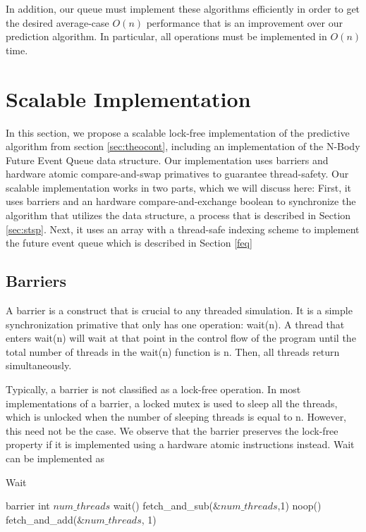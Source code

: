 \documentclass[conference]{IEEEtran}
\begin{document}
In addition, our queue must implement these algorithms efficiently in order to get the desired average-case $O(n)$ performance that is an improvement over our prediction algorithm.  In particular, all operations must be implemented in $O(n)$ time.

\section{Scalable Implementation}
In this section, we propose a scalable lock-free implementation of the predictive algorithm from section \ref{sec:theocont}, including an implementation of the 
N-Body Future Event Queue data structure.  Our implementation uses barriers and hardware atomic compare-and-swap primatives to guarantee thread-safety.  Our scalable implementation
works in two parts, which we will discuss here:  First, it uses barriers and an hardware compare-and-exchange boolean to synchronize the algorithm that utilizes the data structure, 
a process that is described in Section \ref{sec:stsp}.  Next, it uses an array with a thread-safe indexing scheme to implement the future event queue which is described in Section \ref{feq}
\subsection{Barriers}
\label{sec:barrier}
A barrier is a construct that is crucial to any threaded simulation.  It is a simple synchronization primative that only has one operation: wait(n).  
A thread that enters wait(n) will wait at that point in the control flow of the program until the total number of threads in the wait(n) function is n.  Then,
all threads return simultaneously.

Typically, a barrier is not classified as a lock-free operation.  In most implementations of a barrier, a locked mutex is used to sleep all the threads, which is 
unlocked when the number of sleeping threads is equal to n.  However, this need not be the case.  We observe that the barrier preserves the lock-free property if it is implemented
using a hardware atomic instructions instead.  Wait can be implemented as 

\begin{algorithm}
\label{barrier}
\caption{Wait}
\begin{algorithmic}
\STATE barrier
	\STATE int $num\_threads$ 
	\STATE wait()
	\STATE {}
	\STATE fetch\_and\_sub($\&num\_threads$,1)
	\STATE {}
		\STATE noop()
	\ENDWHILE
	\STATE {}
	\STATE fetch\_and\_add($\&num\_threads$, 1)
\end{algorithmic}
\end{algorithm}
\end{document}
